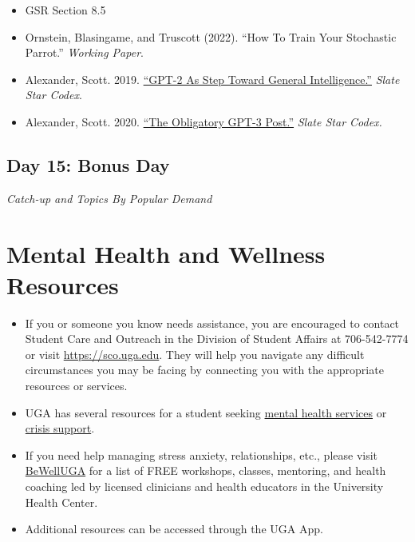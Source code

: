 \documentclass[11pt, letterpaper]{article}
\begin{document}
\begin{itemize}
	\item GSR Section 8.5
	\item Ornstein, Blasingame, and Truscott (2022). ``How To Train Your Stochastic Parrot.'' \textit{Working Paper}.
	\item Alexander, Scott. 2019. \href{https://slatestarcodex.com/2019/02/19/gpt-2-as-step-toward-general-intelligence/}{``GPT-2 As Step Toward General Intelligence.''} \textit{Slate Star Codex}.
	\item Alexander, Scott. 2020. \href{https://slatestarcodex.com/2020/06/10/the-obligatory-gpt-3-post/}{``The Obligatory GPT-3 Post.''} \textit{Slate Star Codex.}
		
\end{itemize}

\subsection*{Day 15: Bonus Day}

\textit{Catch-up and Topics By Popular Demand}

%

\section*{Mental Health and Wellness Resources}

\begin{itemize}
\item If you or someone you know needs assistance, you are encouraged to contact Student Care and Outreach in the Division of Student Affairs at 706-542-7774 or visit \href{https://sco.uga.edu}{https://sco.uga.edu}. They will help you navigate any difficult circumstances you may be facing by connecting you with the appropriate resources or services. 
\item UGA has several resources for a student seeking \href{https://www.uhs.uga.edu/bewelluga/bewelluga}{mental health services} or \href{https://www.uhs.uga.edu/info/emergencies}{crisis support}. 
\item If you need help managing stress anxiety, relationships, etc., please visit \href{https://www.uhs.uga.edu/bewelluga/bewelluga}{BeWellUGA} for a list of FREE workshops, classes, mentoring, and health coaching led by licensed clinicians and health educators in the University Health Center.
\item Additional resources can be accessed through the UGA App.
\end{itemize}



\end{document}
